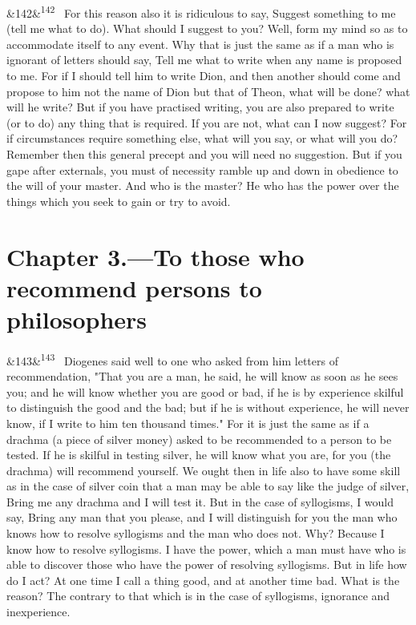 \documentclass[12pt]{article}
\newcommand{\para}[1][]{\par\noindent\ifx&#1&\else\textsuperscript{\footnotesize #1}~\fi}
\begin{document}
\para[142] For this reason also it is ridiculous to say, Suggest something to me (tell me what to do). What should I suggest to you? Well, form my mind so as to accommodate itself to any event. Why that is just the same as if a man who is ignorant of letters should say, Tell me what to write when any name is proposed to me. For if I should tell him to write Dion, and then another should come and propose to him not the name of Dion but that of Theon, what will be done? what will he write? But if you have practised writing, you are also prepared to write (or to do) any thing that is required. If you are not, what can I now suggest? For if circumstances require something else, what will you say, or what will you do? Remember then this general precept and you will need no suggestion. But if you gape after externals, you must of necessity ramble up and down in obedience to the will of your master. And who is the master? He who has the power over the things which you seek to gain or try to avoid.

\section*{Chapter 3.---To those who recommend persons to philosophers}

\para[143] Diogenes said well to one who asked from him letters of recommendation, "That you are a man, he said, he will know as soon as he sees you; and he will know whether you are good or bad, if he is by experience skilful to distinguish the good and the bad; but if he is without experience, he will never know, if I write to him ten thousand times." For it is just the same as if a drachma (a piece of silver money) asked to be recommended to a person to be tested. If he is skilful in testing silver, he will know what you are, for you (the drachma) will recommend yourself. We ought then in life also to have some skill as in the case of silver coin that a man may be able to say like the judge of silver, Bring me any drachma and I will test it. But in the case of syllogisms, I would say, Bring any man that you please, and I will distinguish for you the man who knows how to resolve syllogisms and the man who does not. Why? Because I know how to resolve syllogisms. I have the power, which a man must have who is able to discover those who have the power of resolving syllogisms. But in life how do I act? At one time I call a thing good, and at another time bad. What is the reason? The contrary to that which is in the case of syllogisms, ignorance and inexperience.
\end{document}
